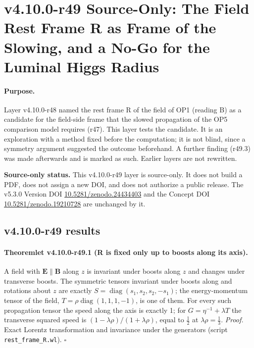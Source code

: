 \clearpage
\section*{v4.10.0-r49 Source-Only: The Field Rest Frame R as Frame of the Slowing, and a No-Go for the Luminal Higgs Radius}
\label{sec:v4100-r49-rest-frame-r}

\paragraph{Purpose.}
Layer v4.10.0-r48 named the rest frame R of the field of OP1 (reading B) as a candidate for the field-side frame that the slowed propagation of
the OP5 comparison model requires (r47).  This layer tests the candidate.  It is an exploration with a method fixed before the computation; it is
not blind, since a symmetry argument suggested the outcome beforehand.  A further finding (r49.3) was made afterwards and is marked as such.
Earlier layers are not rewritten.

\noindent\textbf{Source-only status.}
This v4.10.0-r49 layer is source-only.  It does not build a PDF, does not assign a new DOI,
and does not authorize a public release.  The v5.3.0 Version DOI
\href{https://doi.org/10.5281/zenodo.24434403}{10.5281/zenodo.24434403} and the Concept DOI
\href{https://doi.org/10.5281/zenodo.19210728}{10.5281/zenodo.19210728} are unchanged by it.

\subsection*{v4.10.0-r49 results}
\label{subsec:v4100-r49-results}

\paragraph{Theoremlet v4.10.0-r49.1 (R is fixed only up to boosts along its axis).}
A field with \(\mathbf E\parallel\mathbf B\) along \(z\) is invariant under boosts along \(z\) and changes under transverse boosts.  The symmetric tensors invariant under boosts along and
rotations about \(z\) are exactly \(S=\operatorname{diag}(s_1,s_2,s_2,-s_1)\); the energy-momentum tensor of the field, \(T=\rho\operatorname{diag}(1,1,1,-1)\), is one of them.  For every such
propagation tensor the speed along the axis is exactly 1; for \(G=\eta^{-1}+\lambda T\) the transverse squared speed is \((1-\lambda\rho)/(1+\lambda\rho)\), equal to \(\tfrac12\) at \(\lambda\rho=\tfrac13\).
\emph{Proof.} Exact Lorentz transformation and invariance under the generators (script \texttt{rest\_\allowbreak frame\_\allowbreak R.wl}).  \(\square\)


